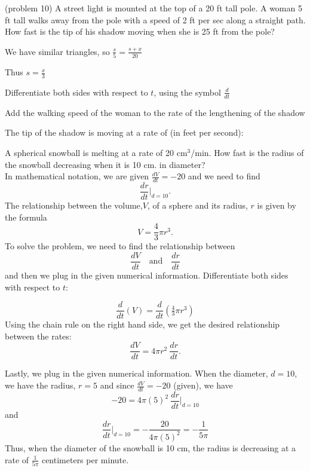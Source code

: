\documentclass{ximera}
\begin{document}
\begin{problem}(problem 10)
A street light is mounted at the top of a 20 ft tall pole.  
A woman 5 ft tall walks away from the pole with a speed of 2 ft per sec along a straight path.  
How fast is the tip of his shadow moving when she is 25 ft from
the pole?
\begin{hint}
We have similar triangles, so $\frac{s}{5}=\frac{s+x}{20}$
\end{hint}
\begin{hint}
Thus $s=\frac{x}{3}$
\end{hint}
\begin{hint}
Differentiate both sides with respect to $t$, using the symbol $\frac{d}{dt}$
\end{hint}
\begin{hint}
Add the walking speed of the woman to the rate of the lengthening of the shadow
\end{hint}

The tip of the shadow is moving at a rate of (in feet per second):
\begin{multipleChoice}
\end{multipleChoice}
\end{problem}


\begin{example}[example 11]
A spherical snowball is melting at a rate of 20 cm$^3$/min. How fast is the radius of the snowball
decreasing when it is 10 cm. in diameter?\\
In mathematical notation, we are given $\frac{dV}{dt} = -20$ and we need to find
\[\frac{dr}{dt}\bigg|_{d = 10}.\]
The relationship between the volume,$V$, of a sphere and its radius, $r$ is given by the formula 
\[V = \frac43 \pi r^3.\]
To solve the problem, we need to find the relationship between 
\[\frac{dV}{dt} \quad \text{and} \quad \frac{dr}{dt}\]
and then we plug in the given numerical information.
Differentiate both sides with respect to $t$:




\[\frac{d}{dt} (V) = \frac{d}{dt}(\tfrac43 \pi r^3)\]
Using the chain rule on the right hand side, we get the desired relationship between the rates:
\[\frac{dV}{dt}  = 4\pi r^2 \  \frac{dr}{dt}.\]

Lastly, we plug in the given numerical information. When the diameter,  $d = 10$, we have the radius, $r = 5$ and since $\frac{dV}{dt}=-20$ (given), we have
\[-20  = 4\pi (5)^2 \ \frac{dr}{dt}\bigg|_{d = 10}\]
and
\[\frac{dr}{dt}\bigg|_{d = 10} = -\frac{20}{4\pi (5)^2} = -\frac{1}{5\pi} \]
Thus, when the diameter of the snowball is  10 cm, the radius is decreasing at a rate of $\frac{1}{5\pi}$ centimeters per minute.
\end{example}
\end{document}
